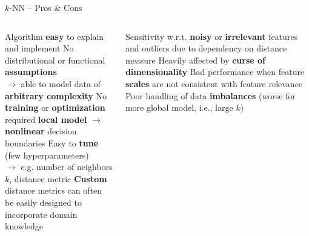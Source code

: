 \begin{frame}{$k$-NN -- Pros \& Cons}

\footnotesize

\begin{columns}[onlytextwidth]
  \begin{column}{0.5\textwidth}
    \footnotesize
    \begin{itemize}
      \positem Algorithm \textbf{easy} to explain and implement
      \positem No distributional or functional \textbf{assumptions}\\
      $\rightarrow$ able to model data of \textbf{arbitrary complexity} %
      \positem No \textbf{training} or \textbf{optimization} required 
      \positem \textbf{local model} $\rightarrow$ \textbf{nonlinear} decision boundaries
      \positem Easy to \textbf{tune} (few hyperparameters)\\
      $\rightarrow$ e.g. number of neighbors $k$, distance metric
      \positem \textbf{Custom} distance metrics can often be easily designed to incorporate domain knowledge
    \end{itemize}
  \end{column}
  \begin{column}{0.5\textwidth}
    \footnotesize
    \begin{itemize}
      \negitem Sensitivity w.r.t. \textbf{noisy} or \textbf{irrelevant} features and outliers due to dependency on distance measure
      \negitem Heavily affected by \textbf{curse of dimensionality}
      \negitem Bad performance when feature \textbf{scales} are not consistent with feature relevance
      \negitem Poor handling of data \textbf{imbalances} (worse for more global model, i.e., large $k$)
    \end{itemize}
  \end{column}
\end{columns}

\vfill

\small


\end{frame}
